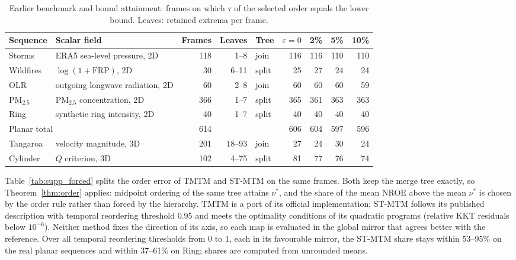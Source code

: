 \documentclass[10pt]{article}
\begin{document}
\begin{table}[h]
\centering\small
\caption{Earlier benchmark and bound attainment: frames on which $\tau$ of the selected order equals the lower bound. Leaves: retained extrema per frame.}\label{tab:supp_bounds}
\begin{tabular}{llrrlrrrr}\toprule
Sequence & Scalar field & Frames & Leaves & Tree & $\varepsilon=0$ & 2\% & 5\% & 10\%\\\midrule
Storms & ERA5 sea-level pressure, 2D & 118 & 1--8 & join & 116 & 116 & 110 & 110\\
Wildfires & $\log(1+\mathrm{FRP})$, 2D & 30 & 6--11 & split & 25 & 27 & 24 & 24\\
OLR & outgoing longwave radiation, 2D & 60 & 2--8 & join & 60 & 60 & 60 & 59\\
PM$_{2.5}$ & PM$_{2.5}$ concentration, 2D & 366 & 1--7 & split & 365 & 361 & 363 & 363\\
Ring & synthetic ring intensity, 2D & 40 & 1--7 & split & 40 & 40 & 40 & 40\\\midrule
\multicolumn{2}{l}{Planar total} & 614 & & & 606 & 604 & 597 & 596\\\midrule
Tangaroa & velocity magnitude, 3D & 201 & 18--93 & join & 27 & 24 & 30 & 24\\
Cylinder & $Q$ criterion, 3D & 102 & 4--75 & split & 81 & 77 & 76 & 74\\\bottomrule
\end{tabular}
\end{table}

Table~\ref{tab:supp_forced} splits the order error of TMTM and ST-MTM on the same frames. Both keep the merge tree exactly, so Theorem~\ref{thm:order} applies: midpoint ordering of the same tree attains $\nu^*$, and the share of the mean NROE above the mean $\nu^*$ is chosen by the order rule rather than forced by the hierarchy. TMTM is a port of its official implementation; ST-MTM follows its published description with temporal reordering threshold $0.95$ and meets the optimality conditions of its quadratic programs (relative KKT residuals below $10^{-6}$). Neither method fixes the direction of its axis, so each map is evaluated in the global mirror that agrees better with the reference. Over all temporal reordering thresholds from 0 to 1, each in its favourable mirror, the ST-MTM share stays within 53--95\% on the real planar sequences and within 37--61\% on Ring; shares are computed from unrounded means.
\end{document}
